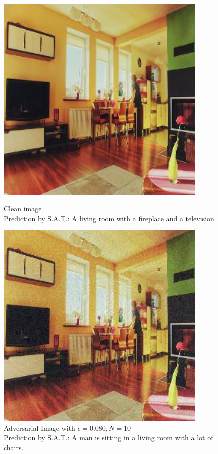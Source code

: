 \begin{figure}[ht]
    \centering
    \begin{minipage}{0.45\textwidth}
        \centering
        \includegraphics[width=0.9\textwidth]{../code/ShowDistractAndDeceive/samples/0.000/img_0.jpg} %
        \caption*{Clean image\\Prediction by S.A.T.: A living room with a fireplace and a television}
    \end{minipage}\hfill
    \begin{minipage}{0.45\textwidth}
        \centering
        \includegraphics[width=0.9\textwidth]{../code/ShowDistractAndDeceive/samples/0.080/img_0.jpg} %
        \caption*{Adversarial Image with $\epsilon=0.080, N=10$\\Prediction by S.A.T.: A man is sitting in a living room with a lot of chairs.}
    \end{minipage}
\end{figure}

